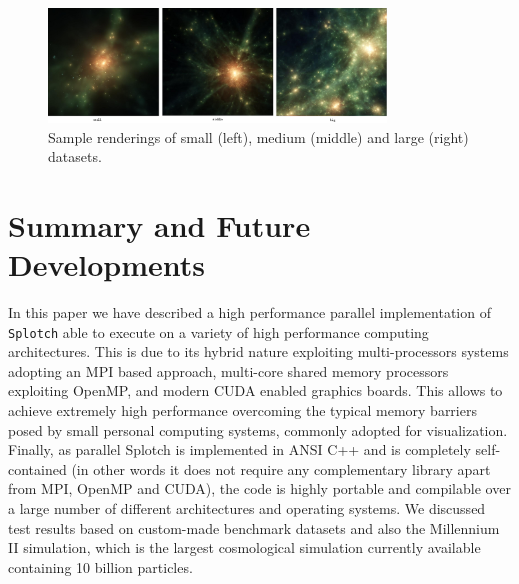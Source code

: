 \begin{figure}
\begin{center}
\includegraphics[width=0.8\textwidth]{cu_images.png}
\end{center}
\caption{Sample renderings of small (left), medium (middle) and large (right) datasets.}\label{cudafig}
\end{figure}

\section{Summary and Future Developments}
\label{conclusions}


In this paper we have described a high performance parallel implementation of {\tt Splotch} 
able to execute on a variety of high performance computing architectures. This is due 
to its hybrid nature exploiting multi-processors systems adopting an MPI based approach, 
multi-core shared memory processors exploiting OpenMP, and modern CUDA enabled graphics 
boards. This allows to achieve extremely high performance overcoming the typical memory 
barriers posed by small personal computing systems, commonly adopted for visualization. 
Finally, as parallel Splotch is implemented in ANSI C++ and is completely self-contained 
(in other words it does not require any complementary library apart from MPI, OpenMP and CUDA), 
the code is highly portable and compilable over a large number of different 
architectures and operating systems. We discussed test results based on 
custom-made benchmark datasets and also the Millennium II simulation, which is the 
largest cosmological simulation currently available containing 10 billion particles.

